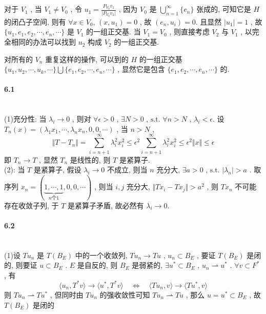 \documentclass[UTF8]{ctexart}
\begin{document}
        对于 $V_1$ , 当 $V_1\neq V_0$ , 令 $u_1=\frac{P_{V_0}v_1}{\vert P_{V_0}v_1\vert}$ ,
        因为 $V_0$ 是 $\bigcup^\infty_{n=1}\{e_n\}$ 张成的, 可知它是 $H$ 的闭凸子空间, 
        则有 $\forall x\in V_0$, $(x, u_1)=0$ , 故 $ (e_n,u_i)=0$.
        且显然 $\vert u_1\vert=1$ , 
        故 $\{u_1, e_1, e_2, \cdots, e_n, \cdots \}$ 是 $V_1$ 的一组正交基.
        当 $V_1 = V_0$ , 则直接考虑 $V_2$ 与 $V_1$ , 以完全相同的办法可以找到 $u_2$ 构成 $V_2$ 的一组正交基.

        对所有的 $V_n$ 重复这样的操作, 可以到的 $H$ 的一组正交基 $\{u_1, u_2, \cdots, u_k, \cdots \}\bigcup\{e_1, e_2, \cdots, e_n, \cdots \}$ , 显然它是包含 $\{e_1, e_2, \cdots, e_n, \cdots \}$ 的.
    
    \paragraph{6.1}\quad\\
        \noindent(1)\quad 充分性: 当 $\lambda_i \rightarrow 0$ , 则对 $\forall \epsilon > 0$ , $\exists N > 0$ , $\text{s.t. } \forall n > N$ , $\lambda_i < \epsilon$.
        设$T_n(x) = (\lambda_1 x_1, \cdots, \lambda_n x_n, 0, 0, \cdots)$ ,
        当 $n > N$ ,
        \[\Vert{T-T_n}\Vert = \sum^{\infty}_{i = n + 1}\lambda_i^2 x_i^2 \le \epsilon^2 \sum^{\infty}_{i = n + 1}\lambda_i^2 x_i^2 \le \epsilon^2 \Vert{x}\Vert \le \epsilon\]
        即 $T_n \rightarrow T$ , 显然 $T_n$ 是线性的, 则 $T$ 是紧算子.\\

        \noindent(2): 当 $T$ 是紧算子, 假设 $\lambda_i \rightarrow 0$ 不成立, 则当 $n$ 充分大, $\exists a > 0$ , $\text{s.t. } \vert{\lambda_n}\vert > a$ . 
        取序列 $x_n = (\underbrace{1, \cdots, 1}_{n\text{个}1}, 0, 0, \cdots)$ , 则当 $i, j$ 充分大, $\Vert{T x_i - T x_j}\Vert > a^2$ , 则 $T x_n$ 不可能存在收敛子列, 于 $T$ 是紧算子矛盾, 故必然有 $\lambda_i \rightarrow 0$.\\

    
    \paragraph{6.2}\quad\\
        \noindent(1)\quad 设 $T u_n$ 是 $T(B_E)$ 中的一个收敛列, $T u_n \rightarrow T u$ , $u_n \subset B_E$ , 要证 $T(B_E)$ 是闭的, 则要证 $u \subset B_E$ .
        $E$ 是自反的, 则 $B_E$ 是弱紧的, $\exists u^* \subset B_E$ , $u_n \rightharpoonup u^*$ . $\forall v \subset F^*$ , 有 
        \[
            \langle{u_n},{T^* v}\rangle \rightarrow \langle{u^*},{T^* v}\rangle \quad \Leftrightarrow \quad \langle{T u_n},{v}\rangle \rightarrow \langle{T u^*},{v}\rangle
        \]
        则 $T u_n \rightharpoonup T u^*$ , 但同时由 $T u_n$ 的强收敛性可知 $T u_n \rightharpoonup T u$ , 那么 $u = u^* \subset B_E$ , 故 $T(B_E)$ 是闭的\\
\end{document}
